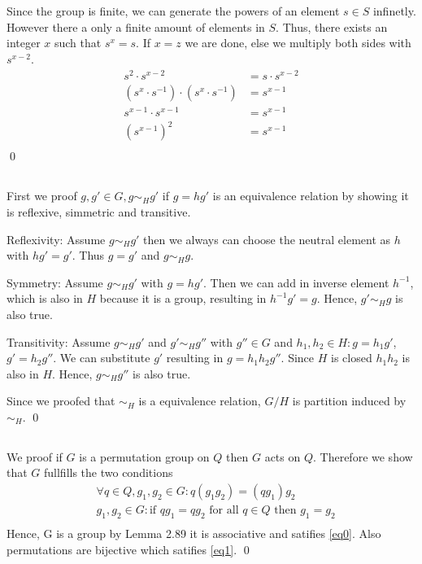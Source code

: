 \documentclass[a4paper,12pt,numbers=noenddot]{scrreport}
\begin{document}
\chapter{}
\section{}
Since the group is finite, we can generate the powers of an element $s \in S$ infinetly.
However there a only a finite amount of elements in $S$. 
Thus, there exists an integer $x$ such that $s^x=s$. 
If $x=z$ we are done, else we multiply both sides with $s^{x-2}$.
\begin{align*}
    s^2 \cdot s^{x-2} &= s \cdot s^{x-2} \\
    (s^{x} \cdot s^{-1}) \cdot (s^{x} \cdot s^{-1}) &= s^{x-1} \\
    s^{x-1} \cdot s^{x-1} &= s^{x-1} \\
    (s^{x-1})^2 &= s^{x-1} \\
\end{align*}
\qed

\section{}
First we proof $g,g' \in G, g \sim_H g'$ if $g = hg'$ is an equivalence relation by showing it is reflexive, simmetric and transitive.

Reflexivity:
Assume $g \sim_H g'$ then we always can choose the neutral element as $h$ with $hg' = g'$. Thus
$g = g'$ and $g \sim_H g$.

Symmetry:
Assume $g \sim_H g'$ with $g = hg'$. Then we can add in inverse element $h^{-1}$, which is also in $H$ because it is a group, resulting in $h^{-1}g'= g$.
Hence, $g' \sim_H g$ is also true.

Transitivity:
Assume $g \sim_H g'$ and $g' \sim_H g''$ with $g'' \in G$ and $h_1, h_2 \in H: g = h_1g'$, $g' = h_2g''$.
We can substitute $g'$ resulting in $g = h_1h_2g''$. Since $H$ is closed $h_1h_2$ is also in $H$. 
Hence, $g \sim_H g''$ is also true.

Since we proofed that $\sim_H$ is a equivalence relation, $G/H$ is partition induced by $\sim_H$.
\qed

\section{}
We proof if $G$ is a permutation group on $Q$ then $G$ acts on $Q$.
Therefore we show that $G$ fullfills the two conditions
\begin{align*}
    & \forall q \in Q, g_1,g_2 \in G: q(g_1g_2) = (qg_1)g_2 \label{eq0}\tag{1} \\
    & g_1,g_2 \in G: \text{if } qg_1 = qg_2 \text{ for all } q \in Q \text{ then } g_1 = g_2 \label{eq1}\tag{2} \\
\end{align*}
Hence, G is a group by Lemma 2.89 it is associative and satifies \eqref{eq0}.
Also permutations are bijective which satifies \eqref{eq1}.
\qed
\end{document}
